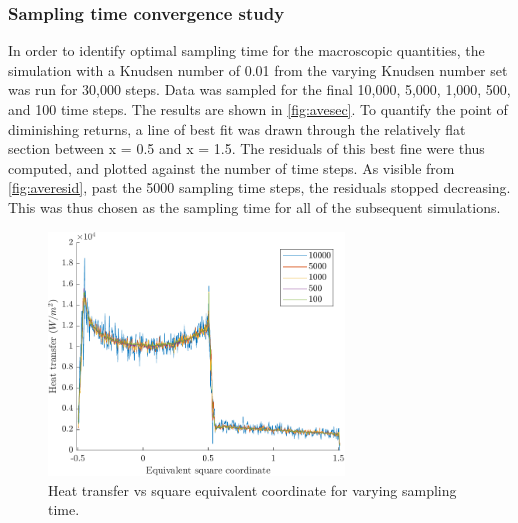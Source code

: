 \subsubsection{Sampling time convergence study}
In order to identify optimal sampling time for the macroscopic quantities, the simulation with a Knudsen number of 0.01 from the varying Knudsen number set was run for 30,000 steps. Data was sampled for the  final 10,000, 5,000, 1,000, 500, and 100 time steps. The results are shown in \autoref{fig:avesec}. To quantify the point of diminishing returns, a line of best fit was drawn through the relatively flat section between x = 0.5 and x = 1.5. The residuals of this best fine were thus computed, and plotted against the number of time steps. As visible from \autoref{fig:averesid}, past the 5000 sampling time steps, the residuals stopped decreasing. This was thus chosen as the sampling time for all of the subsequent simulations.
\begin{figure}[h]
    \centering
    \includegraphics[width=0.7\textwidth]{Images/3. Methodology/Timestep average convergence/avesec.pdf}
    \caption{Heat transfer vs square equivalent coordinate for varying sampling time.}
    \label{fig:avesec}
\end{figure}

